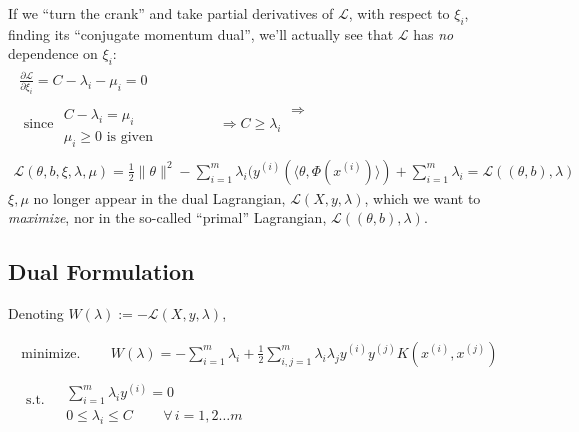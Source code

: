 \documentclass[10pt]{amsart}
\begin{document}
\begin{multicols*}{2}
If we ``turn the crank'' and take partial derivatives of $\mathcal{L}$, with respect to $\xi_i$, finding its ``conjugate momentum dual'', we'll actually see that $\mathcal{L}$ has \emph{no} dependence on $\xi_i$:
\begin{equation}
\begin{gathered} \begin{gathered}
  \frac{ \partial \mathcal{L}}{ \partial \xi_i} = C-\lambda_i -\mu_i = 0 \\ 
  \text{ since } \begin{aligned} & \quad \\
    C - \lambda_i = \mu_i \\
    \mu_i \geq 0 \text{ is given } \end{aligned} \qquad \, \Longrightarrow C \geq \lambda_i 
  \end{gathered}
  \Longrightarrow \\
  \mathcal{L}(\theta,b,\xi,\lambda,\mu) = \frac{1}{2} \| \theta \|^2 - \sum_{i=1}^m \lambda_i(y^{(i)} ( \langle \theta, \Phi(x^{(i)})\rangle ) + \sum_{i=1}^m \lambda_i  = \mathcal{L}((\theta,b),\lambda)
  \end{gathered}
  \end{equation}
$\xi,\mu$ no longer appear in the dual Lagrangian, $\mathcal{L}(X,y,\lambda)$, which we want to \emph{maximize}, nor in the so-called ``primal'' Lagrangian, $\mathcal{L}((\theta,b),\lambda)$.  


\subsection{Dual Formulation}\label{Sec:DualFormulation}

Denoting $W(\lambda):= -\mathcal{L}(X,y,\lambda)$, 

\begin{equation}\label{Eq:DualFormulation}
\boxed{ \begin{gathered}
  \text{minimize}. \qquad \, W(\lambda) = -\sum_{i=1}^m \lambda_i +\frac{1}{2} \sum_{i,j=1}^m \lambda_i \lambda_j y^{(i)} y^{(j)} K(x^{(i)},x^{(j)}) \\
  \text{ s.t. } \begin{aligned} & \quad \\
    & \sum_{i=1}^m \lambda_i y^{(i)} = 0  \\
    & 0 \leq \lambda_i \leq C \qquad \, \forall \, i = 1,2 \dots m \end{aligned}
  \end{gathered} }
  \end{equation}


\end{multicols*}
\end{document}
